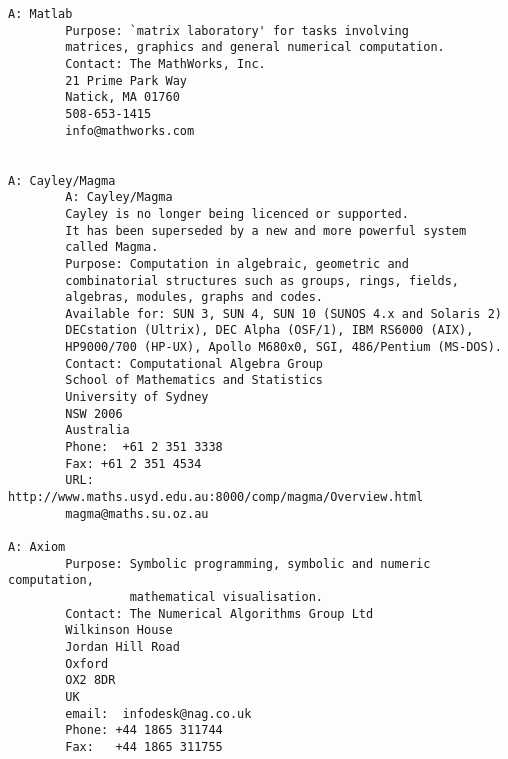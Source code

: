 \begin{verbatim}
A: Matlab
        Purpose: `matrix laboratory' for tasks involving
        matrices, graphics and general numerical computation.
        Contact: The MathWorks, Inc.
        21 Prime Park Way
        Natick, MA 01760
        508-653-1415
        info@mathworks.com


A: Cayley/Magma
        A: Cayley/Magma
        Cayley is no longer being licenced or supported.
        It has been superseded by a new and more powerful system
        called Magma.
        Purpose: Computation in algebraic, geometric and
        combinatorial structures such as groups, rings, fields,
        algebras, modules, graphs and codes.
        Available for: SUN 3, SUN 4, SUN 10 (SUNOS 4.x and Solaris 2)
        DECstation (Ultrix), DEC Alpha (OSF/1), IBM RS6000 (AIX),
        HP9000/700 (HP-UX), Apollo M680x0, SGI, 486/Pentium (MS-DOS).
        Contact: Computational Algebra Group
        School of Mathematics and Statistics
        University of Sydney
        NSW 2006
        Australia
        Phone:  +61 2 351 3338
        Fax: +61 2 351 4534
        URL: http://www.maths.usyd.edu.au:8000/comp/magma/Overview.html
        magma@maths.su.oz.au

A: Axiom
        Purpose: Symbolic programming, symbolic and numeric computation,
                 mathematical visualisation.
        Contact: The Numerical Algorithms Group Ltd
        Wilkinson House
        Jordan Hill Road
        Oxford
        OX2 8DR
        UK
        email:  infodesk@nag.co.uk
        Phone: +44 1865 311744
        Fax:   +44 1865 311755
\end{verbatim}
